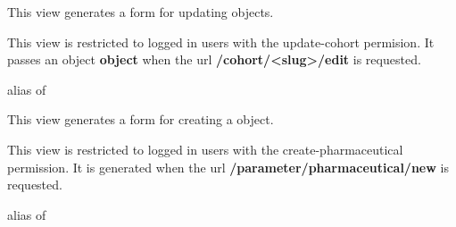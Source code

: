 \documentclass[letterpaper,10pt,english]{sphinxmanual}
\begin{document}
\begin{fulllineitems}
\label{data:mousedb.data.views.CohortUpdate}
This view generates a form for updating {\hyperref[data:mousedb.data.models.Cohort]{}} objects.

This view is restricted to logged in users with the update-cohort permision. 
It passes an object \textbf{object} when the url \textbf{/cohort/\textless{}slug\textgreater{}/edit} is requested.

\begin{fulllineitems}
\label{data:mousedb.data.views.CohortUpdate.model}
alias of 

\end{fulllineitems}


\end{fulllineitems}


\begin{fulllineitems}
\label{data:mousedb.data.views.PharmaceuticalCreate}
This view generates a form for creating a {\hyperref[data:mousedb.data.models.Pharmaceutical]{}} object.

This view is restricted to logged in users with the create-pharmaceutical permission.
It is generated when the url \textbf{/parameter/pharmaceutical/new} is requested.

\begin{fulllineitems}
\label{data:mousedb.data.views.PharmaceuticalCreate.model}
alias of 

\end{fulllineitems}


\end{fulllineitems}

\end{document}
